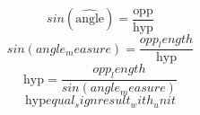 \[sin(\widehat{{\text{{{angle}}}}})=\frac{{\text{{{opp}}}}}{{\text{{{hyp}}}}}\]
\[sin({angle_measure})=\frac{{{opp_length}}}{{\text{{{hyp}}}}}\]
\[\text{{{hyp}}}=\frac{{{opp_length}}}{{sin({angle_measure})}}\]
\[\text{{{hyp}}}{equal_sign}{result_with_unit}\]
